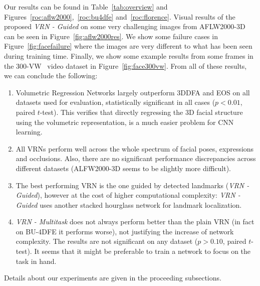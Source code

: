 Our results can be found in Table~\ref{tab:overview} and
Figures~\ref{roc:aflw2000},~\ref{roc:bu4dfe} and~\ref{roc:florence}.
Visual results of the proposed \textit{VRN - Guided} on some very
challenging images from AFLW2000-3D can be seen in
Figure~\ref{fig:aflw2000res}. We show some failure cases in
Figure~\ref{fig:facefailure} where the images are very different to
what has been seen during training time. Finally, we show some example
results from some frames in the 300-VW~\cite{sagonas2013300} video
dataset in Figure~\ref{fig:face300vw}. From all of these results, we
can conclude the following:
\begin{enumerate}
\item Volumetric Regression Networks largely outperform 3DDFA and EOS
  on all datasets used for evaluation, statistically significant in
  all cases ($p < 0.01$, paired $t$-test). This verifies that directly
  regressing the 3D facial structure using the volumetric
  representation, is a much easier problem for CNN learning.
\item All VRNs perform well across the whole spectrum of facial poses,
  expressions and occlusions. Also, there are no significant performance
  discrepancies across different datasets (ALFW2000-3D seems to be
  slightly more difficult).
\item The best performing VRN is the one guided by detected landmarks
  (\textit{VRN - Guided}), however at the cost of higher computational
  complexity: \textit{VRN - Guided} uses another stacked hourglass
  network for landmark localization.
\item \textit{VRN - Multitask} does not always perform better than the
  plain VRN (in fact on BU-4DFE it performs worse), not justifying the
  increase of network complexity. The results are not significant on
  any dataset ($p > 0.10$, paired $t$-test).  It seems that it might
  be preferable to train a network to focus on the task in hand.
\end{enumerate}

\noindent Details about our experiments are given in the proceeding subsections.

